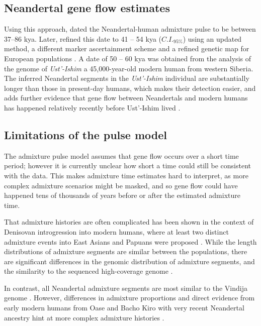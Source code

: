 \documentclass[11pt]{article}
\begin{document}
\subsection{Neandertal gene flow estimates}
Using this approach,   \cite{sankararaman_date_2012} dated the Neandertal-human admixture pulse to be between 37--86 kya. Later, \cite{moorjani_genetic_2016} refined this date to 41 -- 54 kya ($C.I._{95\%}$) using an updated method, a different marker ascertainment scheme and a refined genetic map for European populations . A date of 50 -- 60 kya was obtained from the analysis of the genome of \textit{Ust'-Ishim} a 45,000-year-old modern human from western Siberia. The inferred Neandertal segments in the \textit{Ust'-Ishim} individual are substantially longer than those in present-day humans, which makes their detection easier, and adds further evidence that gene flow between Neandertals and modern humans has happened relatively recently before Ust'-Ishim lived \citep{fu_genome_2014}.


\subsection{Limitations of the pulse model}\label{Why can't we us the pulse model}

The admixture pulse model assumes that gene flow occurs over a short time period; however it is currently unclear how short a time could still be consistent with the data. This makes admixture time estimates hard to interpret, as more complex admixture scenarios might be masked, and so gene flow could have happened tens of thousands of years before or after the estimated admixture time.

That admixture histories are often complicated has been shown in the context of Denisovan introgression into modern humans, where at least two distinct admixture events into East Asians and Papuans were proposed \citep{browning_analysis_2018, jacobs_multiple_2019}. While the length distributions of admixture segments are similar between the populations, there are significant differences in the genomic distribution of admixture segments, and the similarity to the sequenced high-coverage genome \citep{browning_analysis_2018, massilani_denisovan_2020}. 

In contrast, all Neandertal admixture segments are most similar to the Vindija genome \citep{prufer_high-coverage_2017}. However, differences in admixture proportions \citep{meyer_high-coverage_2012, wall_higher_2013,kim_selection_2015,vernot_complex_2015,villanea_multiple_2019} and direct evidence from early modern humans from Oase and Bacho Kiro with very recent Neandertal ancestry  hint at more complex admixture histories \citep{fu_early_2015,hajdinjak_initial_2021}.
\end{document}
